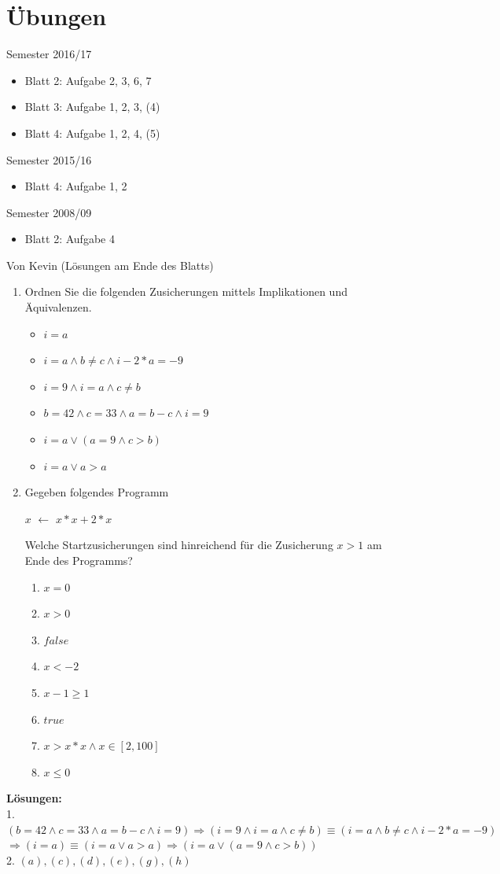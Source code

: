 \documentclass[hidelinks]{article}
\newcommand\Let[2]{\State #1 $\gets$ #2}
\theoremstyle{plain}
\theoremstyle{definition}
\theoremstyle{rem}
\begin{document}
\begin{sloppypar}
\section{Übungen}
Semester 2016/17
\begin{itemize}
\item Blatt 2: Aufgabe 2, 3, 6, 7
\item Blatt 3: Aufgabe 1, 2, 3, (4)
\item Blatt 4: Aufgabe 1, 2, 4, (5)
\end{itemize}
Semester 2015/16
\begin{itemize}
\item Blatt 4: Aufgabe 1, 2
\end{itemize}
Semester 2008/09
\begin{itemize}
\item Blatt 2: Aufgabe 4
\end{itemize}
Von Kevin (Lösungen am Ende des Blatts)
\begin{enumerate}
\item Ordnen Sie die folgenden Zusicherungen mittels Implikationen und Äquivalenzen.
\begin{itemize}
	\item $i=a$
	\item $i=a \wedge b\neq c\wedge i-2*a=-9$
	\item $i=9 \wedge i=a\wedge c\neq b$
	\item $b=42 \wedge c=33 \wedge a=b-c \wedge i=9$
	\item $i=a \vee (a=9 \wedge c>b)$
	\item $i=a \vee a>a$
\end{itemize}
\item Gegeben folgendes Programm
\begin{algorithm}[H]
    \begin{algorithmic}[1]
		\Let{$x$}{$x*x+2*x$}
	\EndWhile
  \end{algorithmic}
\end{algorithm}
Welche Startzusicherungen sind hinreichend für die Zusicherung $x>1$ am Ende des Programms?
\begin{enumerate}
	\item $x=0$
	\item $x>0$
	\item $false$
	\item $x<-2$
	\item $x-1\ge 1$
	\item $true$
	\item $x>x*x\wedge x\in[2,100]$
	\item $x\le0$
\end{enumerate}
\end{enumerate}
\newpage
\textbf{Lösungen:}\\
1. $(b=42 \wedge c=33 \wedge a=b-c \wedge i=9)\Rightarrow(i=9\wedge i=a \wedge c\neq b)\equiv(i=a \wedge b\neq c\wedge i-2*a=-9)$\\
$\Rightarrow(i=a)\equiv(i=a \vee a>a)\Rightarrow(i=a \vee (a=9 \wedge c>b))$\\
2. $(a),(c),(d),(e),(g),(h)$
\end{sloppypar}
\end{document}
